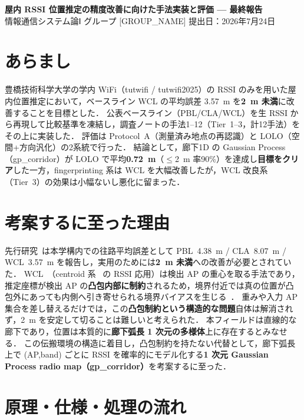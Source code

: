 \documentclass[a4paper,twocolumn]{ltjsarticle}
\begin{document}
\begin{center}
  {\large\bfseries 屋内 RSSI 位置推定の精度改善に向けた手法実装と評価 — 最終報告}\\[3pt]
  {\small 情報通信システム論Ⅰ \quad グループ [GROUP\_NAME]  \quad 提出日：2026年7月24日}
\end{center}

\section{あらまし}

豊橋技術科学大学の学内 WiFi（tutwifi / tutwifi2025）の RSSI のみを用いた屋内位置推定において，ベースライン WCL の平均誤差 3.57~m を\textbf{2~m 未満}に改善することを目標とした．
公表ベースライン（PBL/CLA/WCL）を生 RSSI から再現して比較基準を凍結し，調査ノートの手法1--12（Tier~1--3，計12手法）をその上に実装した．
評価は Protocol~A（測量済み地点の再認識）と LOLO（空間+方向汎化）の2系統で行った．
結論として，廊下1D の Gaussian Process（gp\_corridor）が LOLO で平均\textbf{0.72~m}（$\leq$2~m 率90\%）を達成し\textbf{目標をクリア}した一方，fingerprinting 系は WCL を大幅改善したが，WCL 改良系（Tier~3）の効果は小幅ないし悪化に留まった．

\section{考案するに至った理由}

先行研究~\cite{tanaka2023tut}は本学構内での往路平均誤差として PBL~4.38~m / CLA~8.07~m / WCL~3.57~m を報告し，実用のためには\textbf{2~m 未満}への改善が必要とされていた．
WCL~\cite{blumenthal2007wcl}（centroid 系~\cite{bulusu2000gpsless} の RSSI 応用）は検出 AP の重心を取る手法であり，推定座標が検出 AP の\textbf{凸包内部に制約}されるため，境界付近では真の位置が凸包外にあっても内側へ引き寄せられる境界バイアスを生じる~\cite{ji2012vap}．
重みや入力 AP 集合を差し替えるだけでは，この\textbf{凸包制約という構造的な問題}自体は解消されず，2~m を安定して切ることは難しいと考えられた．
本フィールドは直線的な廊下であり，位置は本質的に\textbf{廊下弧長 1 次元の多様体}上に存在するとみなせる．
この伝搬環境の構造に着目し，凸包制約を持たない代替として，廊下弧長上で (AP,band) ごとに RSSI を確率的にモデル化する\textbf{1 次元 Gaussian Process radio map（gp\_corridor）}を考案するに至った．

\section{原理・仕様・処理の流れ}
\end{document}
